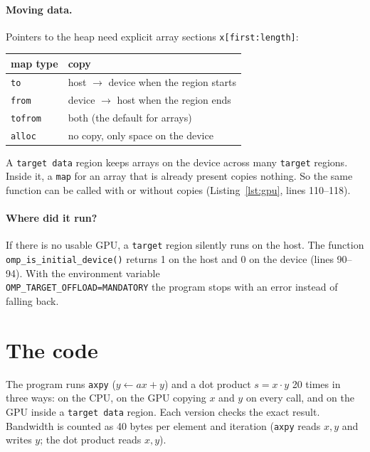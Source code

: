 \documentclass[11pt,a4paper]{article}
\let\origtexttt\texttt
\renewcommand{\texttt}[1]{\textcolor{black!60}{\origtexttt{#1}}}
\begin{document}
\paragraph{Moving data.} Pointers to the heap need explicit array sections
\texttt{x[first:length]}:
\begin{center}
\small
\begin{tabular}{@{}ll@{}}
\toprule
map type & copy \\ \midrule
\texttt{to}     & host $\rightarrow$ device when the region starts \\
\texttt{from}   & device $\rightarrow$ host when the region ends \\
\texttt{tofrom} & both (the default for arrays) \\
\texttt{alloc}  & no copy, only space on the device \\
\bottomrule
\end{tabular}
\end{center}
A \texttt{target data} region keeps arrays on the device across many \texttt{target} regions.
Inside it, a \texttt{map} for an array that is already present copies nothing. So the same
function can be called with or without copies (Listing~\ref{lst:gpu}, lines 110--118).

\paragraph{Where did it run?} If there is no usable GPU, a \texttt{target} region silently runs
on the host. The function \texttt{omp\_is\_initial\_device()} returns 1 on the host and 0 on
the device (lines 90--94). With the environment variable\\
\texttt{OMP\_TARGET\_OFFLOAD=MANDATORY} the program stops with an error instead of falling
back.

\section{The code}
The program runs \texttt{axpy} ($y \leftarrow a x + y$) and a dot product $s = x\cdot y$ 20
times in three ways: on the CPU, on the GPU copying $x$ and $y$ on every call, and on the GPU
inside a \texttt{target data} region. Each version checks the exact result. Bandwidth is
counted as 40 bytes per element and iteration (\texttt{axpy} reads $x,y$ and writes $y$;
the dot product reads $x,y$).
\end{document}
